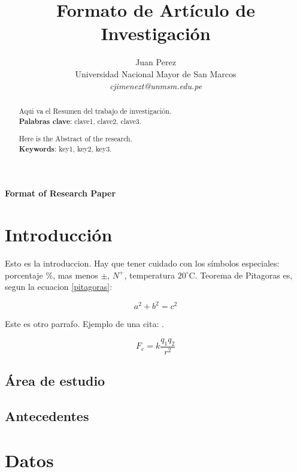 \documentclass[a4paper,11pt]{article}
\title{Formato de Artículo de Investigación}
\author{Juan Perez\\
 Universidad Nacional Mayor de San Marcos \\
\emph{cjimenezt@unmsm.edu.pe}\\}
\begin{document}
\maketitle{}

\begin{abstract} \noindent{}
	Aqui va el Resumen del trabajo de investigación. \\
	\textbf{Palabras clave}: clave1, clave2, clave3.
\end{abstract}

\centerline{\textbf{Format of Research Paper}}
\renewcommand{\abstractname}{Abstract}

\begin{abstract} \noindent{}
	Here is the Abstract of the research. \\
	\textbf{Keywords}: key1, key2, key3.
\end{abstract}


\section{Introducción}
Esto es la introduccion. Hay que tener cuidado con los símbolos especiales: porcentaje \%, mas menos \( \pm \), \( N^+ \), temperatura \( 20^\circ \)C. Teorema de Pitagoras es, segun la ecuacion \ref{pitagoras}:

\begin{equation}
	a^2 + b^2 = c^2
	\label{pitagoras}
\end{equation}

Este es otro parrafo. Ejemplo de una cita: \cite{Ben2018}.

\begin{equation}
	F_e = k \frac{q_1 q_{2}}{r^2}
\end{equation}

\subsection*{Área de estudio}

\subsection*{Antecedentes}

\section{Datos}
\end{document}
